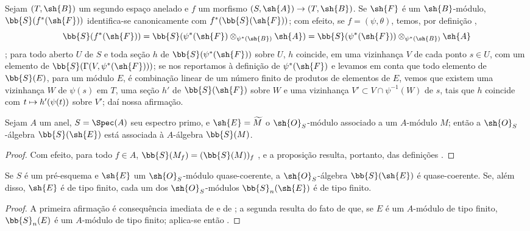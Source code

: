 \documentclass[oneside,10pt]{amsart}
\makeatletter
\newcommand{\ega@arrow}[2]{\mathchoice{#1}{#2}{#2}{#2}}
\let\ega@shortmapsto\mapsto
\renewcommand{\to}{\ega@arrow{\longrightarrow}{\rightarrow}}
\renewcommand{\mapsto}{\ega@arrow{\longmapsto}{\ega@shortmapsto}}
\let\EGAOriginalLabel\label
\renewcommand{\label}[1]{\phantomsection\EGAOriginalLabel{#1}}
\makeatother
\begin{document}
\begin{env}[1.7.5]
\label{II.1.7.5}
Sejam $(T,\sh{B})$ um segundo espaço anelado e $f$ um morfismo $(S,\sh{A})\to(T,\sh{B})$.
Se $\sh{F}$ é um $\sh{B}$-módulo, $\bb{S}(f^*(\sh{F}))$ identifica-se canonicamente com $f^*(\bb{S}(\sh{F}))$; com efeito, se $f=(\psi,\theta)$, temos, por definição ,
\[
  \bb{S}(f^*(\sh{F}))=\bb{S}(\psi^*(\sh{F})\otimes_{\psi^*(\sh{B})}\sh{A})=\bb{S}(\psi^*(\sh{F}))\otimes_{\psi^*(\sh{B})}\sh{A}
\]
; para todo aberto $U$ de $S$ e toda seção $h$ de $\bb{S}(\psi^*(\sh{F}))$ sobre $U$, $h$ coincide, em uma vizinhança $V$ de cada ponto $s\in U$, com um elemento de $\bb{S}(\Gamma(V,\psi^*(\sh{F})))$; se nos reportamos à definição de $\psi^*(\sh{F})$  e levamos em conta que todo elemento de $\bb{S}(E)$, para um módulo $E$, é combinação linear de um número finito de produtos de elementos de $E$, vemos que existem uma vizinhança $W$ de $\psi(s)$ em $T$, uma seção $h'$ de $\bb{S}(\sh{F})$ sobre $W$ e uma vizinhança $V'\subset V\cap\psi^{-1}(W)$ de $s$, tais que $h$ coincide com $t\mapsto h'(\psi(t))$ sobre $V'$; daí nossa afirmação.
\end{env}

\begin{proposition}[1.7.6]
\label{II.1.7.6}
Sejam $A$ um anel, $S=\Spec(A)$ seu espectro primo, e $\sh{E}=\widetilde{M}$ o $\sh{O}_S$-módulo associado a um $A$-módulo $M$; então a $\sh{O}_S$-álgebra $\bb{S}(\sh{E})$ está associada à $A$-álgebra $\bb{S}(M)$.
\end{proposition}

\begin{proof}
Com efeito, para todo $f\in A$, $\bb{S}(M_f)=(\bb{S}(M))_f$ , e a proposição resulta, portanto, das definições .
\end{proof}

\begin{corollary}[1.7.7]
\label{II.1.7.7}
Se $S$ é um pré-esquema e $\sh{E}$ um $\sh{O}_S$-módulo quase-coerente, a $\sh{O}_S$-álgebra $\bb{S}(\sh{E})$ é quase-coerente.
Se, além disso, $\sh{E}$ é de tipo finito, cada um dos $\sh{O}_S$-módulos $\bb{S}_n(\sh{E})$ é de tipo finito.
\end{corollary}

\begin{proof}
A primeira afirmação é consequência imediata de  e de ; a segunda resulta do fato de que, se $E$ é um $A$-módulo de tipo finito, $\bb{S}_n(E)$ é um $A$-módulo de tipo finito; aplica-se então .
\end{proof}
\end{document}
